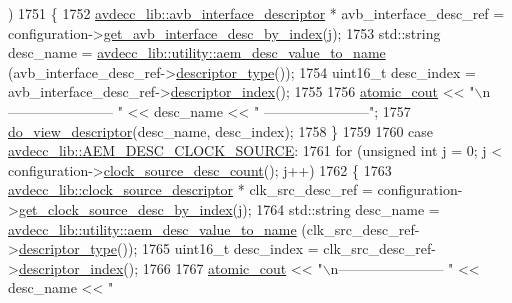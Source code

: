 \begin{DoxyCode}
      )
1751         \{
1752             \hyperlink{classavdecc__lib_1_1avb__interface__descriptor}{avdecc\_lib::avb\_interface\_descriptor} * 
      avb\_interface\_desc\_ref = configuration->\hyperlink{classavdecc__lib_1_1configuration__descriptor_a177c390ccb74a31750b8eb0feb406144}{get\_avb\_interface\_desc\_by\_index}(j);
1753             std::string desc\_name = \hyperlink{namespaceavdecc__lib_1_1utility_a6bdd02679e5a911a071d4aa03be341f0}{avdecc\_lib::utility::aem\_desc\_value\_to\_name}
      (avb\_interface\_desc\_ref->\hyperlink{classavdecc__lib_1_1descriptor__base_a5112b70022171063ec5d3242bee9910e}{descriptor\_type}());
1754             uint16\_t desc\_index = avb\_interface\_desc\_ref->\hyperlink{classavdecc__lib_1_1descriptor__base_a7eed5583bffdf72d89021b188648c1b5}{descriptor\_index}();
1755 
1756             \hyperlink{cmd__line_8h_a0bc38ccc65c79ba06c6fcd7b4bf554c3}{atomic\_cout} << \textcolor{stringliteral}{"\(\backslash\)n----------------------- "} << desc\_name << \textcolor{stringliteral}{"
       -----------------------"};
1757             \hyperlink{classcmd__line_aef7d9f8c4eff85c46e5b7aea0961bb51}{do\_view\_descriptor}(desc\_name, desc\_index);
1758         \}
1759 
1760     \textcolor{keywordflow}{case} \hyperlink{namespaceavdecc__lib_ac7b7d227e46bc72b63ee9e9aae15902faad2bbd7b33d8d136ac379369c1d77091}{avdecc\_lib::AEM\_DESC\_CLOCK\_SOURCE}:
1761         \textcolor{keywordflow}{for} (\textcolor{keywordtype}{unsigned} \textcolor{keywordtype}{int} j = 0; j < configuration->\hyperlink{classavdecc__lib_1_1configuration__descriptor_a705df684f456b2c082d52c563125e853}{clock\_source\_desc\_count}(); j++)
1762         \{
1763             \hyperlink{classavdecc__lib_1_1clock__source__descriptor}{avdecc\_lib::clock\_source\_descriptor} * clk\_src\_desc\_ref = 
      configuration->\hyperlink{classavdecc__lib_1_1configuration__descriptor_aefc07c368de7626396dbf6d6605f1b48}{get\_clock\_source\_desc\_by\_index}(j);
1764             std::string desc\_name = \hyperlink{namespaceavdecc__lib_1_1utility_a6bdd02679e5a911a071d4aa03be341f0}{avdecc\_lib::utility::aem\_desc\_value\_to\_name}
      (clk\_src\_desc\_ref->\hyperlink{classavdecc__lib_1_1descriptor__base_a5112b70022171063ec5d3242bee9910e}{descriptor\_type}());
1765             uint16\_t desc\_index = clk\_src\_desc\_ref->\hyperlink{classavdecc__lib_1_1descriptor__base_a7eed5583bffdf72d89021b188648c1b5}{descriptor\_index}();
1766 
1767             \hyperlink{cmd__line_8h_a0bc38ccc65c79ba06c6fcd7b4bf554c3}{atomic\_cout} << \textcolor{stringliteral}{"\(\backslash\)n----------------------- "} << desc\_name << \textcolor{stringliteral}{"
}
\end{DoxyCode}
